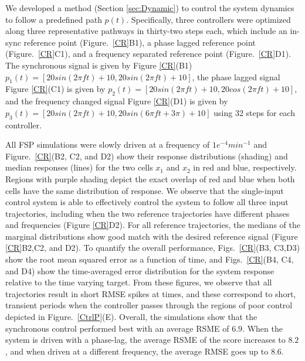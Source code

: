 \documentclass[12pt]{iopart}
\begin{document}
We developed a method (Section \ref{sec:Dynamic}) to control the system dynamics to follow a predefined path $p(t)$. Specifically, three controllers were optimized along three representative pathways in thirty-two steps each, which include an in-sync reference point (Figure.\ \ref{CR}B1), a phase lagged reference point (Figure.\ \ref{CR}C1),  and a  frequency separated reference point (Figure.\ \ref{CR}D1). The synchronous signal is given by Figure \ref{CR}(B1) $p_1(t)=[20 sin(2 \pi f t)+10, 20 sin(2 \pi f t)+10]$, the phase lagged signal Figure \ref{CR}(C1) is given by $p_2(t)=[20 sin(2 \pi f t)+10, 20 cos(2 \pi f t)+10]$, and the frequency changed signal Figure \ref{CR}(D1) is given by $p_3(t)=[20 sin(2 \pi f t)+10, 20 sin(6 \pi f t+3\pi)+10]$ using 32 steps for each controller. 

All FSP simulations were slowly driven at a frequency of $1e^{-4} min^{-1}$    and Figure.\ \ref{CR}(B2, C2, and D2) show their response distributions (shading) and median responses (lines) for the two cells $x_1$ and $x_2$ in red and blue, respectively. Regions with purple shading depict the exact overlap of red and blue when both cells have the same distribution of response. We observe that the single-input control system is able to effectively control the system to follow all three input trajectories, including when the two reference trajectories have different phases and frequencies (Figure \ref{CR}D2). 
For all reference trajectories, the medians of the marginal distributions show good match with the desired reference signal (Figure \ref{CR}B2,C2, and D2). To quantify the overall performance, Figs.\ \ref{CR}(B3, C3,D3) show the root mean squared error as a function of time,
and Figs.\ \ref{CR}(B4, C4, and D4) show the time-averaged error distribution for the system response relative to the time varying target. From these figures, we observe that all trajectories result in short RMSE spikes at times, and these correspond to short, transient periods when the controller passes through the regions of poor control depicted in Figure.\ \ref{CtrlP}(E). Overall, the simulations show that the synchronous control performed best with an average RSME of $6.9$. When the system is driven with a phase-lag, the average RSME of the score increases to $8.2$, and when driven at a different frequency, the average RMSE goes up to $8.6$.  
\end{document}
